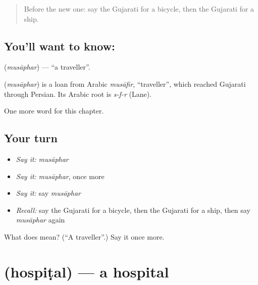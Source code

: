 \label{lesson:GU-C127-musaphar}



\begin{quote}
Before the new one: say the Gujarati for a bicycle, then the Gujarati for a ship.
\end{quote}

\subsection*{You'll want to know: }
\textbf{} (\emph{musāphar}) — \textquotedblleft{}a traveller\textquotedblright{}.

\begin{cousinweb}
\textbf{} (\emph{musāphar}) is a loan from Arabic \emph{musāfir}, \textquotedblleft{}traveller\textquotedblright{}, which reached Gujarati through Persian. Its Arabic root is \emph{s-f-r} (Lane).
\end{cousinweb}

\begin{grammarlens}[title={What you've built}]
One more word for this chapter.
\end{grammarlens}

\subsection*{Your turn}
\begin{itemize}
\raggedright
  \item \emph{Say it:} \emph{musāphar}
  \item \emph{Say it:} \emph{musāphar}, once more
  \item \emph{Say it:} say \emph{musāphar}
  \item \emph{Recall:} say the Gujarati for a bicycle, then the Gujarati for a ship, then say \emph{musāphar} again
\end{itemize}

\begin{tcolorbox}[breakable,colback=teal!4,colframe=teal!35!black,title={Before you move on}]
What does  mean? (\textquotedblleft{}A traveller\textquotedblright{}.) Say it once more.
\end{tcolorbox}
\section[\texorpdfstring{\gu{હોસ્પિટલ} (hospiṭal)}{હોસ્પિટલ (hospiṭal)}]{ (hospiṭal) — a hospital}

